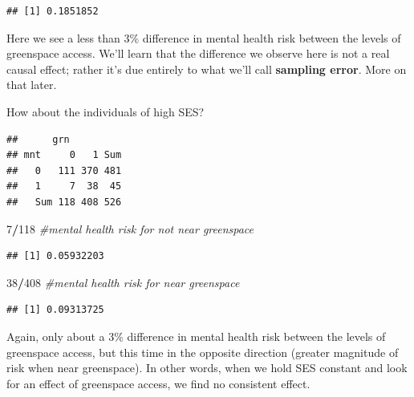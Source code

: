 \documentclass[
]{book}
\newenvironment{Shaded}{\begin{snugshade}}{\end{snugshade}}
\newcommand{\AttributeTok}[1]{\textcolor[rgb]{0.13,0.29,0.53}{#1}}
\newcommand{\CommentTok}[1]{\textcolor[rgb]{0.56,0.35,0.01}{\textit{#1}}}
\newcommand{\DecValTok}[1]{\textcolor[rgb]{0.00,0.00,0.81}{#1}}
\newcommand{\FunctionTok}[1]{\textcolor[rgb]{0.13,0.29,0.53}{\textbf{#1}}}
\newcommand{\NormalTok}[1]{#1}
\newcommand{\SpecialCharTok}[1]{\textcolor[rgb]{0.81,0.36,0.00}{\textbf{#1}}}
\newcommand{\StringTok}[1]{\textcolor[rgb]{0.31,0.60,0.02}{#1}}
\begin{document}
\begin{verbatim}
## [1] 0.1851852
\end{verbatim}

Here we see a less than 3\% difference in mental health risk between the levels of greenspace access. We'll learn that the difference we observe here is not a real causal effect; rather it's due entirely to what we'll call \textbf{sampling error}. More on that later.

How about the individuals of high SES?

\begin{Shaded}
\end{Shaded}

\begin{verbatim}
##      grn
## mnt     0   1 Sum
##   0   111 370 481
##   1     7  38  45
##   Sum 118 408 526
\end{verbatim}

\begin{Shaded}
\begin{Highlighting}[]
\DecValTok{7}\SpecialCharTok{/}\DecValTok{118} \CommentTok{\#mental health risk for not near greenspace}
\end{Highlighting}
\end{Shaded}

\begin{verbatim}
## [1] 0.05932203
\end{verbatim}

\begin{Shaded}
\begin{Highlighting}[]
\DecValTok{38}\SpecialCharTok{/}\DecValTok{408} \CommentTok{\#mental health risk for near greenspace}
\end{Highlighting}
\end{Shaded}

\begin{verbatim}
## [1] 0.09313725
\end{verbatim}

Again, only about a 3\% difference in mental health risk between the levels of greenspace access, but this time in the opposite direction (greater magnitude of risk when near greenspace). In other words, when we hold SES constant and look for an effect of greenspace access, we find no consistent effect.
\end{document}
